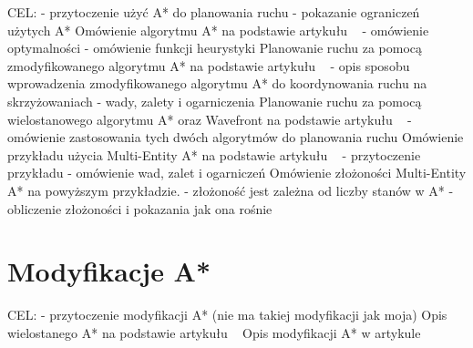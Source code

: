 CEL:
\newline
- przytoczenie użyć A* do planowania ruchu
\newline
- pokazanie ograniczeń użytych A*
\newline
\newline
Omówienie algorytmu A* na podstawie artykułu ~\cite{dechter1985generalized} 
\newline
- omówienie optymalności
\newline
- omówienie funkcji heurystyki
\newline
\newline
Planowanie ruchu za pomocą zmodyfikowanego algorytmu A* na podstawie artykułu ~\cite{munteanmobile} 
\newline
- opis sposobu wprowadzenia zmodyfikowanego algorytmu A* do koordynowania ruchu na skrzyżowaniach
\newline
- wady, zalety i ogarniczenia
\newline
\newline
Planowanie ruchu za pomocą wielostanowego algorytmu A* oraz Wavefront na podstawie artykułu ~\cite{wojnicki2015robust} 
\newline
- omówienie zastosowania tych dwóch algorytmów do planowania ruchu
\newline
\newline
Omówienie przykładu użycia Multi-Entity A* na podstawie artykułu ~\cite{wojnicki2015robust} 
\newline
- przytoczenie przykładu
\newline
- omówienie wad, zalet i ogarniczeń
\newline
\newline
Omówienie złożoności Multi-Entity A* na powyższym przykładzie.
\newline
- złożoność jest zależna od liczby stanów w A*
\newline
- obliczenie złożoności i pokazania jak ona rośnie
\newline
\newline

\section{Modyfikacje A*}

CEL:
\newline
- przytoczenie modyfikacji A* (nie ma takiej modyfikacji jak moja)
\newline
\newline
Opis wielostanego A* na podstawie artykułu ~\cite{wojnicki2015robust} 
\newline
\newline
Opis modyfikacji A* w artykule ~\cite{munteanmobile}
\newline
\newline
